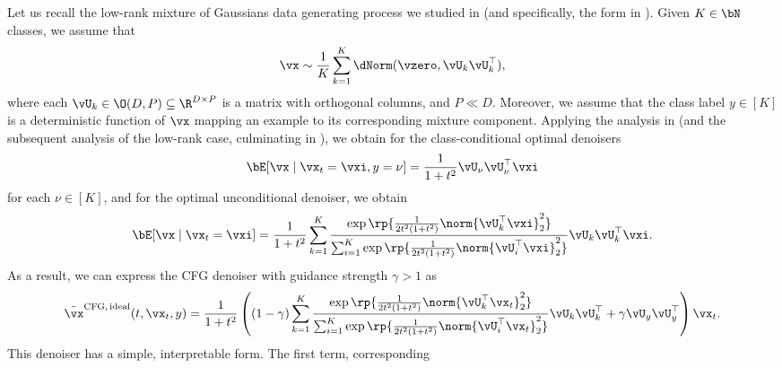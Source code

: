 \documentclass[../../book-main.tex]{subfiles}
\begin{document}
\begin{example}\label{example:denoising-gaussian-mixture-cfg}
  Let us recall the low-rank mixture of Gaussians data generating process we studied in
   (and specifically, the form in
  ). Given $K \in \bN$ classes, we assume that
  \begin{equation}\label{eq:MoG1-ch6}
    \vx \sim \frac{1}{K}\sum_{k = 1}^{K}\dNorm(\vzero, \vU_{k}\vU_{k}^{\top}),
  \end{equation}
  where each \(\vU_{k} \in \O(D, P) \subseteq \R^{D \times P}\) is a matrix with
  orthogonal columns, and $P \ll D$.
  Moreover, we assume that the class label $y \in [K]$ is a deterministic
  function of $\vx$ mapping an example to its corresponding mixture component.
  Applying the analysis in  (and the
  subsequent analysis of the low-rank case, culminating in
  ), we obtain for the class-conditional optimal
  denoisers
  \begin{equation}\label{eq:gmm_lowrank_denoiser-ch6-classcond}
    \bE[ \vx \mid \vx_t = \vxi, y = \nu ]
    = \frac{1}{1 + t^{2}}
    \vU_{\nu}\vU_{\nu}^{\top}\vxi
  \end{equation}
  for each $\nu \in [K]$, and for the optimal unconditional denoiser, we obtain
  \begin{equation}\label{eq:gmm_lowrank_denoiser-ch6-uncond}
    \bE[ \vx \mid \vx_t = \vxi ]
    = \frac{1}{1 + t^{2}}\sum_{k = 1}^{K}\frac{\exp\rp{\frac{1}{2t^{2}(1 + t^{2})}\norm{\vU_{k}^{\top}\vxi}_{2}^{2}}}{\sum_{i = 1}^{K}\exp\rp{\frac{1}{2t^{2}(1 + t^{2})}\norm{\vU_{i}^{\top}\vxi}_{2}^{2}}}\vU_{k}\vU_{k}^{\top}\vxi.
  \end{equation}
  As a result, we can express the CFG denoiser with guidance strength $\gamma
  > 1$ as
  \begin{equation}\label{eq:cfg-denoiser-mog-low-rank}
    \bar{\vx}^{\mathrm{CFG,\,ideal}}(t, \vx_t, y)
    =
    \frac{1}{1 + t^{2}}
    \left(
    (1 - \gamma) 
    \sum_{k = 1}^{K}\frac{\exp\rp{\frac{1}{2t^{2}(1
    + t^{2})}\norm{\vU_{k}^{\top}\vx_t}_{2}^{2}}}{\sum_{i
    = 1}^{K}\exp\rp{\frac{1}{2t^{2}(1
    + t^{2})}\norm{\vU_{i}^{\top}\vx_t}_{2}^{2}}}\vU_{k}\vU_{k}^{\top}
    +
    \gamma 
    \vU_{y}\vU_{y}^{\top}
    \right)
    \vx_t.
  \end{equation}
  This denoiser has a simple, interpretable form. The first term, corresponding

\end{example}
\end{document}
